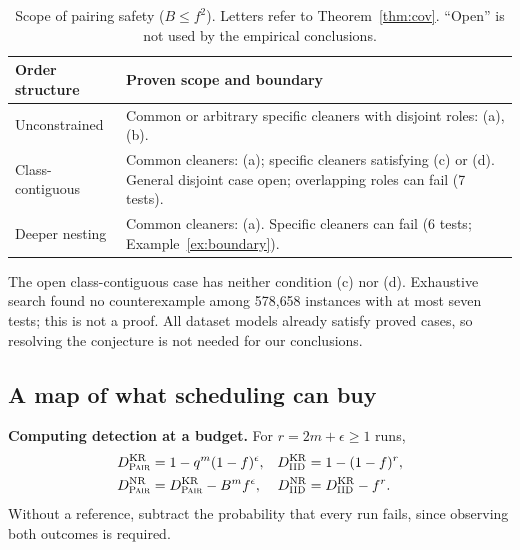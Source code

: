 \documentclass[conference,letterpaper]{IEEEtran}
\theoremstyle{definition}
\newcommand{\IIDp}{\textup{\textsc{IID}}}
\newcommand{\PAIRp}{\textup{\textsc{Pair}}}
\begin{document}
\begin{table}[t]
\caption{Scope of pairing safety ($B\le f^2$). Letters refer to Theorem~\ref{thm:cov}. ``Open'' is not used by the empirical conclusions.}\label{tab:classify}
\centering\small
\begin{tabular}{@{}lp{}@{}}
\toprule
Order structure & Proven scope and boundary\\
\midrule
Unconstrained & Common or arbitrary specific cleaners with disjoint roles: (a), (b).\\
Class-contiguous & Common cleaners: (a); specific cleaners satisfying (c) or (d). General disjoint case open; overlapping roles can fail (7 tests).\\
Deeper nesting & Common cleaners: (a). Specific cleaners can fail (6 tests; Example~\ref{ex:boundary}).\\
\bottomrule
\end{tabular}
\end{table}
\label{conj:two}
The open class-contiguous case has neither condition (c) nor (d). Exhaustive search found no counterexample among 578{,}658 instances with at most seven tests; this is not a proof. All dataset models already satisfy proved cases, so resolving the conjecture is not needed for our conclusions.

\subsection{A map of what scheduling can buy}
\textbf{Computing detection at a budget.} For $r=2m+\epsilon\ge1$ runs,
\begin{equation}\label{thm:budget}
\begin{aligned}
D^{\mathrm{KR}}_{\PAIRp}&=1-q^m(1-f)^\epsilon,&D^{\mathrm{KR}}_{\IIDp}&=1-(1-f)^r,\\
D^{\mathrm{NR}}_{\PAIRp}&=D^{\mathrm{KR}}_{\PAIRp}-B^mf^\epsilon,&D^{\mathrm{NR}}_{\IIDp}&=D^{\mathrm{KR}}_{\IIDp}-f^r.
\end{aligned}
\end{equation}
Without a reference, subtract the probability that every run fails, since observing both outcomes is required.
\end{document}
